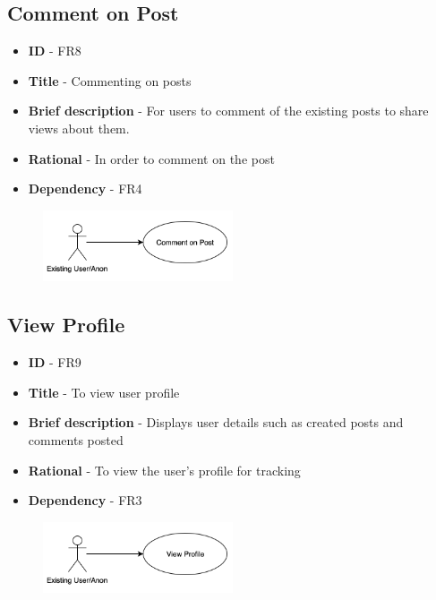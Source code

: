 \documentclass[12pt]{report}
\begin{document}
\subsection{Comment on Post}
\begin{itemize}
    \item \textbf{ID} - FR8
    \item \textbf{Title} - Commenting on posts
    \item \textbf{Brief description} - For users to comment of the existing posts to share views about them.
    \item \textbf{Rational} - In order to comment on the post
    \item \textbf{Dependency} - FR4
\end{itemize}
\begin{figure}[h]
\includegraphics[width=0.5\textwidth]{comment.png}
\end{figure}

\subsection{View Profile}
\begin{itemize}
    \item \textbf{ID} - FR9
    \item \textbf{Title} - To view user profile
    \item \textbf{Brief description} - Displays user details such as created posts and comments posted
    \item \textbf{Rational} - To view the user's profile for tracking
    \item \textbf{Dependency} - FR3
\end{itemize}
\begin{figure}[h]
\includegraphics[width=0.5\textwidth]{viewprofile.png}
\end{figure}
\end{document}
